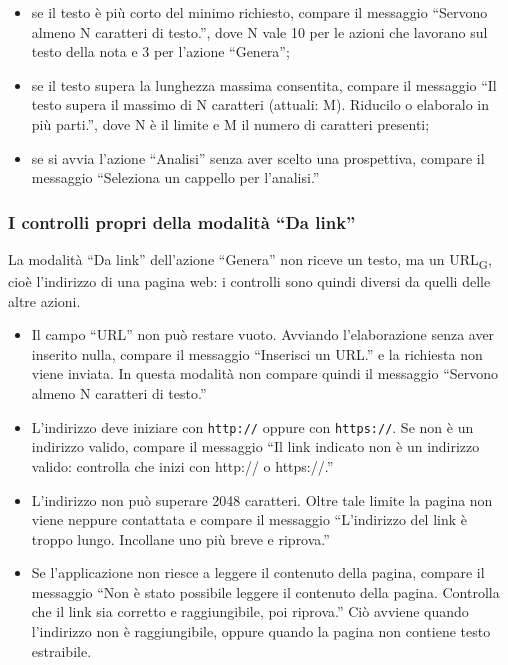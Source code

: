 \documentclass[a4paper, 10pt]{article}
\begin{document}
\begin{itemize}
    \item se il testo è più corto del minimo richiesto, compare il messaggio ``Servono almeno N caratteri di testo.'', dove N vale 10 per le azioni che lavorano sul testo della nota e 3 per l'azione ``Genera'';

    \item se il testo supera la lunghezza massima consentita, compare il messaggio ``Il testo supera il massimo di N caratteri (attuali: M). Riducilo o elaboralo in più parti.'', dove N è il limite e M il numero di caratteri presenti;

    \item se si avvia l'azione ``Analisi'' senza aver scelto una prospettiva, compare il messaggio ``Seleziona un cappello per l'analisi.''
\end{itemize}

\subsubsection{I controlli propri della modalità ``Da link''}
\label{sec:controlli-da-link}
La modalità ``Da link'' dell'azione ``Genera'' non riceve un testo, ma un URL\textsubscript{G}, cioè l'indirizzo di una pagina web: i controlli sono quindi diversi da quelli delle altre azioni.

\begin{itemize}
    \item Il campo ``URL'' non può restare vuoto. Avviando l'elaborazione senza aver inserito nulla, compare il messaggio ``Inserisci un URL.'' e la richiesta non viene inviata. In questa modalità non compare quindi il messaggio ``Servono almeno N caratteri di testo.''

    \item L'indirizzo deve iniziare con \texttt{http://} oppure con \texttt{https://}. Se non è un indirizzo valido, compare il messaggio ``Il link indicato non è un indirizzo valido: controlla che inizi con http:// o https://.''

    \item L'indirizzo non può superare 2048 caratteri. Oltre tale limite la pagina non viene neppure contattata e compare il messaggio ``L'indirizzo del link è troppo lungo. Incollane uno più breve e riprova.''

    \item Se l'applicazione non riesce a leggere il contenuto della pagina, compare il messaggio ``Non è stato possibile leggere il contenuto della pagina. Controlla che il link sia corretto e raggiungibile, poi riprova.'' Ciò avviene quando l'indirizzo non è raggiungibile, oppure quando la pagina non contiene testo estraibile.
\end{itemize}
\end{document}
